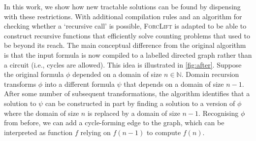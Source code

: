 
In this work, we show how new tractable solutions can be found by dispensing
with these restrictions. With additional compilation rules and an algorithm for
checking whether a `recursive call' is possible, \textsc{ForcLift}
\citep{DBLP:conf/ijcai/BroeckTMDR11} is adapted to be able to construct
recursive functions that efficiently solve counting problems that used to be
beyond its reach. The main conceptual difference from the original algorithm is
that the input formula is now compiled to a labelled directed graph rather than
a circuit (i.e., cycles are allowed). This idea is illustrated in
\cref{fig:after}. Suppose the original formula $\phi$ depended on a domain of
size $n \in \mathbb{N}$. Domain recursion transforms $\phi$ into a different
formula $\psi$ that depends on a domain of size $n-1$. After some number of
subsequent transformations, the algorithm identifies that a solution to $\psi$
can be constructed in part by finding a solution to a version of $\phi$ where
the domain of size $n$ is replaced by a domain of size $n-1$. Recognising $\phi$
from before, we can add a cycle-forming edge to the graph, which can be
interpreted as function $f$ relying on $f(n-1)$ to compute $f(n)$.



